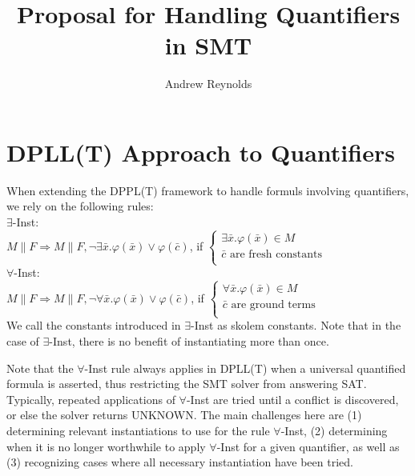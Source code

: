 \documentclass{llncs}
\begin{document}
\title{Proposal for Handling Quantifiers in SMT}

\author{Andrew Reynolds}

\date{}

\maketitle
\thispagestyle{empty}

\section{DPLL(T) Approach to Quantifiers}

When extending the DPPL(T) framework to handle formuls involving quantifiers, we rely on the following rules: \\

\noindent $\exists$-Inst: \\

$M \parallel F \Longrightarrow M \parallel F, \neg \exists \bar{x}. \varphi( \bar{ x } ) \vee \varphi( \bar{ c } )$, if   
$\begin{cases}
  \exists \bar{x}. \varphi( \bar{ x } ) \in M \\
  \bar{ c } \text{ are fresh constants} \\
\end{cases}$ \\

\noindent $\forall$-Inst: \\

$M \parallel F \Longrightarrow M \parallel F, \neg \forall \bar{x}. \varphi( \bar{ x } ) \vee \varphi( \bar{ c } )$, if   
$\begin{cases}
  \forall \bar{x}. \varphi( \bar{ x } ) \in M \\
  \bar{ c } \text{ are ground terms} \\
\end{cases}$ \\

We call the constants introduced in $\exists$-Inst as skolem constants.
Note that in the case of $\exists$-Inst, there is no benefit of instantiating more than once.

Note that the $\forall$-Inst rule always applies in DPLL(T) when a universal quantified formula is asserted, thus restricting the SMT solver from answering SAT.
Typically, repeated applications of $\forall$-Inst are tried until a conflict is discovered, or else the solver returns UNKNOWN.
The main challenges here are (1) determining relevant instantiations to use for the rule $\forall$-Inst, (2) determining when it is no longer worthwhile to apply $\forall$-Inst for a given quantifier, as well as (3) recognizing cases where all necessary instantiation have been tried.
\end{document}

